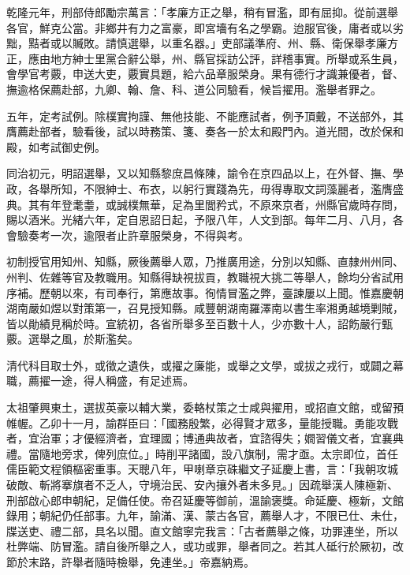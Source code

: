 \begin{pinyinscope}
乾隆元年，刑部侍郎勵宗萬言：「孝廉方正之舉，稍有冒濫，即有屈抑。從前選舉各官，鮮克公當。非鄉井有力之富豪，即宮墻有名之學霸。迨服官後，庸者或以劣黜，黠者或以贓敗。請慎選舉，以重名器。」吏部議準府、州、縣、衛保舉孝廉方正，應由地方紳士里黨合辭公舉，州、縣官採訪公評，詳稽事實。所舉或系生員，會學官考覈，申送大吏，覈實具題，給六品章服榮身。果有德行才識兼優者，督、撫逾格保薦赴部，九卿、翰、詹、科、道公同驗看，候旨擢用。濫舉者罪之。

五年，定考試例。除樸實拘謹、無他技能、不能應試者，例予頂戴，不送部外，其膺薦赴部者，驗看後，試以時務策、箋、奏各一於太和殿門內。道光間，改於保和殿，如考試御史例。

同治初元，明詔選舉，又以知縣黎庶昌條陳，諭令在京四品以上，在外督、撫、學政，各舉所知，不限紳士、布衣，以躬行實踐為先，毋得專取文詞藻麗者，濫膺盛典。其有年登耄耋，或誠樸無華，足為里閭矜式，不原來京者，州縣官歲時存問，賜以酒米。光緒六年，定自恩詔日起，予限八年，人文到部。每年二月、八月，各會驗奏考一次，逾限者止許章服榮身，不得與考。

初制授官用知州、知縣，厥後薦舉人眾，乃推廣用途，分別以知縣、直隸州州同、州判、佐雜等官及教職用。知縣得缺視拔貢，教職視大挑二等舉人，餘均分省試用序補。歷朝以來，有司奉行，第應故事。徇情冒濫之弊，臺諫屢以上聞。惟嘉慶朝湖南嚴如煜以對策第一，召見授知縣。咸豐朝湖南羅澤南以書生率湘勇越境剿賊，皆以勛績見稱於時。宣統初，各省所舉多至百數十人，少亦數十人，詔飭嚴行甄覈。選舉之風，於斯濫矣。

清代科目取士外，或徵之遺佚，或擢之廉能，或舉之文學，或拔之戎行，或闢之幕職，薦擢一途，得人稱盛，有足述焉。

太祖肇興東土，選拔英豪以輔大業，委輅杖策之士咸與擢用，或招直文館，或留預帷幄。乙卯十一月，諭群臣曰：「國務殷繁，必得賢才眾多，量能授職。勇能攻戰者，宜治軍；才優經濟者，宜理國；博通典故者，宜諮得失；嫺習儀文者，宜襄典禮。當隨地旁求，俾列庶位。」時削平諸國，設八旗制，需才亟。太宗即位，首任儒臣範文程領樞密重事。天聰八年，甲喇章京硃繼文子延慶上書，言：「我朝攻城破敵、斬將搴旗者不乏人，守境治民、安內攘外者未多見。」因疏舉漢人陳極新、刑部啟心郎申朝紀，足備任使。帝召延慶等御前，溫諭褒獎。命延慶、極新，文館錄用；朝紀仍任部事。九年，諭滿、漢、蒙古各官，薦舉人才，不限已仕、未仕，牒送吏、禮二部，具名以聞。直文館寧完我言：「古者薦舉之條，功罪連坐，所以杜弊端、防冒濫。請自後所舉之人，或功或罪，舉者同之。若其人砥行於厥初，改節於末路，許舉者隨時檢舉，免連坐。」帝嘉納焉。


\end{pinyinscope}
